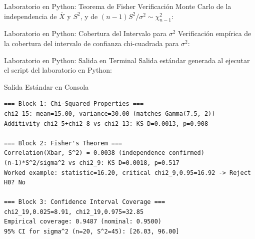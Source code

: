 \documentclass[10pt, aspectratio=169]{beamer}
\begin{document}
\begin{frame}[fragile]{Laboratorio en Python: Teorema de Fisher}
  \scriptsize
  Verificación Monte Carlo de la independencia de $\bar X$ y $S^2$, y de $(n-1)S^2/\sigma^2\sim\chi^2_{n-1}$:
  {
  }
\end{frame}

\begin{frame}[fragile]{Laboratorio en Python: Cobertura del Intervalo para $\sigma^2$}
  \scriptsize
  Verificación empírica de la cobertura del intervalo de confianza chi-cuadrada para $\sigma^2$:
  {
  }
\end{frame}

\begin{frame}[fragile]{Laboratorio en Python: Salida en Terminal}
  \scriptsize
  Salida estándar generada al ejecutar el script del laboratorio en Python:
  \vspace{0.02cm}
  \begin{block}{Salida Estándar en Consola}
    \fontsize{4pt}{5pt}\selectfont
    \begin{verbatim}
=== Block 1: Chi-Squared Properties ===
chi2_15: mean=15.00, variance=30.00 (matches Gamma(7.5, 2))
Additivity chi2_5+chi2_8 vs chi2_13: KS D=0.0013, p=0.908

=== Block 2: Fisher's Theorem ===
Correlation(Xbar, S^2) = 0.0038 (independence confirmed)
(n-1)*S^2/sigma^2 vs chi2_9: KS D=0.0018, p=0.517
Worked example: statistic=16.20, critical chi2_9,0.95=16.92 -> Reject H0? No

=== Block 3: Confidence Interval Coverage ===
chi2_19,0.025=8.91, chi2_19,0.975=32.85
Empirical coverage: 0.9487 (nominal: 0.9500)
95% CI for sigma^2 (n=20, S^2=45): [26.03, 96.00]
    \end{verbatim}
  \end{block}
\end{frame}
\end{document}

